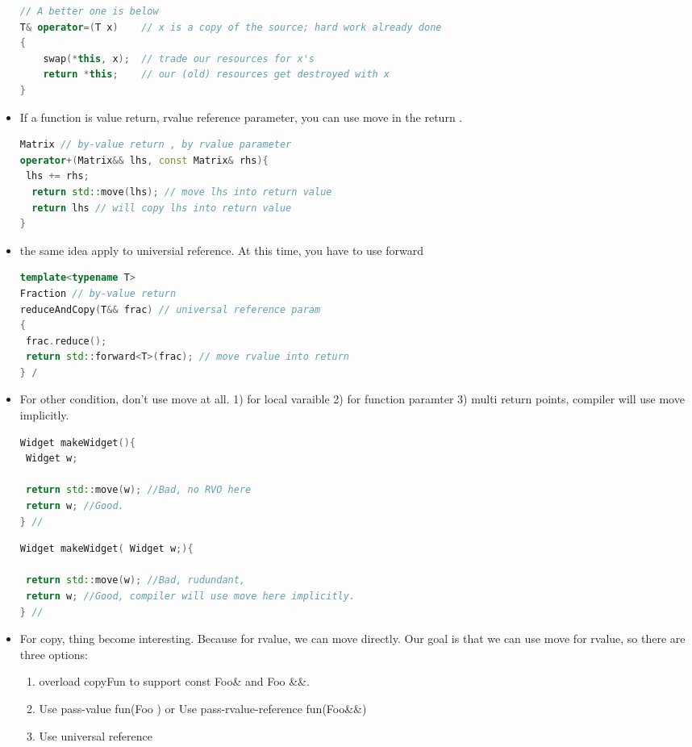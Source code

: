 \documentclass[a4paper,12pt,twoside]{book}
\begin{document}
\begin{itemize}
\begin{lstlisting}[frame=single, language=c++]
// A better one is below
T& operator=(T x)    // x is a copy of the source; hard work already done
{
    swap(*this, x);  // trade our resources for x's
    return *this;    // our (old) resources get destroyed with x
}
\end{lstlisting}

\item If a function is value return, rvalue reference parameter, you can use move in the return .
\begin{lstlisting}[frame=single, language=c++]
Matrix // by-value return , by rvalue parameter
operator+(Matrix&& lhs, const Matrix& rhs){
 lhs += rhs;
  return std::move(lhs); // move lhs into return value
  return lhs // will copy lhs into return value 
} 
\end{lstlisting}

\item the same idea apply to universial reference. At this time, you have to use forward 
\begin{lstlisting}[frame=single, language=c++]
template<typename T>
Fraction // by-value return
reduceAndCopy(T&& frac) // universal reference param
{
 frac.reduce();
 return std::forward<T>(frac); // move rvalue into return
} /
\end{lstlisting}

\item For other condition, don't use move at all. 1) for local varaible  2) for function paramter 3) multi return points, compiler will use move implicitly. 
\begin{lstlisting}[frame=single, language=c++]
Widget makeWidget(){
 Widget w;

 return std::move(w); //Bad, no RVO here
 return w; //Good. 
} // 
\end{lstlisting}

\begin{lstlisting}[frame=single, language=c++]
Widget makeWidget( Widget w;){

 return std::move(w); //Bad, rudundant, 
 return w; //Good, compiler will use move here implicitly. 
} // 
\end{lstlisting}

\item For copy, thing become interesting. Because for rvalue, we can move directly. Our goal is that we can use move for rvalue, so there are three options: 

	\begin{enumerate}
		\item overload copyFun to support const Foo\& and Foo \&\&.  
		\item Use pass-value fun(Foo ) or Use pass-rvalue-reference fun(Foo\&\&)
		\item Use universal reference
	\end{enumerate}
	

\end{itemize}
\end{document}
